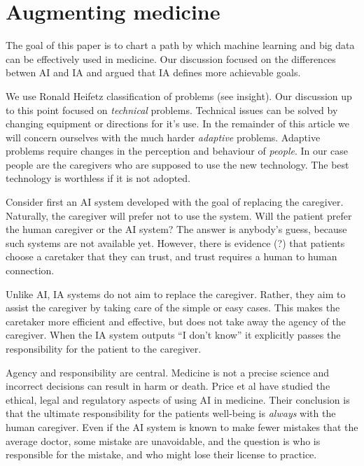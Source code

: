 \documentclass[11pt]{pnas-new}
\begin{document}
\section{Augmenting medicine}


The goal of this paper is to chart a path by which machine learning
and big data can be effectively used in medicine. Our discussion
focused on the differences betwen AI and IA and argued that IA
defines more achievable goals.

We use Ronald Heifetz classification of problems (see insight). Our
discussion up to this point focused on {\em technical}
problems. Technical issues can be solved by changing equipment or
directions for it's use. In the remainder of this article we will
concern ourselves with the much harder {\em adaptive}
problems. Adaptive problems require changes in the perception and
behaviour of {\em people}. In our case people are the caregivers who
are supposed to use the new technology. The best technology is
worthless if it is not adopted.

Consider first an AI system developed with the goal of replacing the
caregiver. Naturally, the caregiver will prefer not to use the
system. Will the patient prefer the human caregiver or the AI system?
The answer is anybody's guess, because such systems are not available
yet. However, there is evidence (?) that patients choose a caretaker
that they can trust, and trust requires a human to human connection. 

Unlike AI, IA systems do not aim to replace the caregiver. Rather,
they aim to assist the caregiver by taking care of the simple or easy
cases. This makes the caretaker more efficient and effective, but does
not take away the agency of the caregiver. When the IA system outputs
``I don't know'' it explicitly passes the responsibility for the
patient to the caregiver.

Agency and responsibility are central. Medicine is not a precise
science and incorrect decisions can result in harm or death.
Price et al have studied the ethical, legal and regulatory
aspects of using AI in medicine.\cite{price2014black,ford2016privacy, ford2017regulating}
Their conclusion is that the ultimate responsibility for the patients
well-being is {\em always} with the human caregiver. Even if the AI
system is known to make fewer mistakes that the average doctor, some
mistake are unavoidable, and the question is who is responsible for
the mistake, and who might lose their license to practice.
\end{document}
